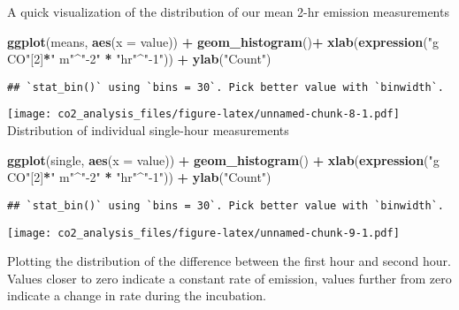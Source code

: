 \documentclass[]{article}
\newenvironment{Shaded}{\begin{snugshade}}{\end{snugshade}}
\newcommand{\KeywordTok}[1]{\textcolor[rgb]{0.13,0.29,0.53}{\textbf{#1}}}
\newcommand{\DataTypeTok}[1]{\textcolor[rgb]{0.13,0.29,0.53}{#1}}
\newcommand{\DecValTok}[1]{\textcolor[rgb]{0.00,0.00,0.81}{#1}}
\newcommand{\StringTok}[1]{\textcolor[rgb]{0.31,0.60,0.02}{#1}}
\newcommand{\OperatorTok}[1]{\textcolor[rgb]{0.81,0.36,0.00}{\textbf{#1}}}
\newcommand{\NormalTok}[1]{#1}
\begin{document}
A quick visualization of the distribution of our mean 2-hr emission
measurements

\begin{Shaded}
\begin{Highlighting}[]
\KeywordTok{ggplot}\NormalTok{(means, }\KeywordTok{aes}\NormalTok{(}\DataTypeTok{x =}\NormalTok{ value)) }\OperatorTok{+}
\StringTok{  }\KeywordTok{geom_histogram}\NormalTok{()}\OperatorTok{+}
\StringTok{  }\KeywordTok{xlab}\NormalTok{(}\KeywordTok{expression}\NormalTok{(}\StringTok{"g CO"}\NormalTok{[}\DecValTok{2}\NormalTok{]}\OperatorTok{*}\StringTok{" m"}\OperatorTok{^}\StringTok{"-2"} \OperatorTok{*}\StringTok{ "hr"}\OperatorTok{^}\StringTok{"-1"}\NormalTok{)) }\OperatorTok{+}
\StringTok{  }\KeywordTok{ylab}\NormalTok{(}\StringTok{"Count"}\NormalTok{)}
\end{Highlighting}
\end{Shaded}

\begin{verbatim}
## `stat_bin()` using `bins = 30`. Pick better value with `binwidth`.
\end{verbatim}

\texttt{[image: co2\_analysis\_files/figure-latex/unnamed-chunk-8-1.pdf]}
Distribution of individual single-hour measurements

\begin{Shaded}
\begin{Highlighting}[]
\KeywordTok{ggplot}\NormalTok{(single, }\KeywordTok{aes}\NormalTok{(}\DataTypeTok{x =}\NormalTok{ value)) }\OperatorTok{+}\StringTok{ }
\StringTok{  }\KeywordTok{geom_histogram}\NormalTok{() }\OperatorTok{+}
\StringTok{  }\KeywordTok{xlab}\NormalTok{(}\KeywordTok{expression}\NormalTok{(}\StringTok{"g CO"}\NormalTok{[}\DecValTok{2}\NormalTok{]}\OperatorTok{*}\StringTok{" m"}\OperatorTok{^}\StringTok{"-2"} \OperatorTok{*}\StringTok{ "hr"}\OperatorTok{^}\StringTok{"-1"}\NormalTok{)) }\OperatorTok{+}
\StringTok{  }\KeywordTok{ylab}\NormalTok{(}\StringTok{"Count"}\NormalTok{)}
\end{Highlighting}
\end{Shaded}

\begin{verbatim}
## `stat_bin()` using `bins = 30`. Pick better value with `binwidth`.
\end{verbatim}

\texttt{[image: co2\_analysis\_files/figure-latex/unnamed-chunk-9-1.pdf]}

Plotting the distribution of the difference between the first hour and
second hour. Values closer to zero indicate a constant rate of emission,
values further from zero indicate a change in rate during the
incubation.
\end{document}
